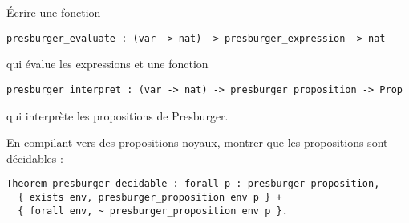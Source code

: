 \documentclass{article}
\begin{document}
Écrire une fonction
\begin{verbatim}
presburger_evaluate : (var -> nat) -> presburger_expression -> nat
\end{verbatim}
qui évalue les expressions et une fonction
\begin{verbatim}
presburger_interpret : (var -> nat) -> presburger_proposition -> Prop
\end{verbatim}
qui interprète les propositions de Presburger.

En compilant vers des propositions noyaux,
montrer que les propositions sont décidables :

\begin{verbatim}
Theorem presburger_decidable : forall p : presburger_proposition,
  { exists env, presburger_proposition env p } +
  { forall env, ~ presburger_proposition env p }.
\end{verbatim}
\end{document}
